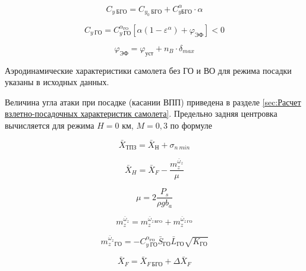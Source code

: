 \begin{equation}
    \label{eq:CyБГО}
    C_{y \ \text{БГО}} = C_{y_0 \ \text{БГО}} + C_{y \text{БГО}}^\alpha \cdot \alpha
\end{equation}  

\begin{equation}
    \label{eq:CyГО}
    C_{y \ \text{ГО}} = C_{y \ \text{ГО}}^{\alpha_\text{ГО}}[\alpha(1 - \varepsilon^\alpha) + \varphi_\text{ЭФ}] < 0
\end{equation}

\begin{equation}
    \label{eq:fiЭФ}
    \varphi_\text{ЭФ} = \varphi_\text{уст} + n_B \cdot \delta_{max}
\end{equation}

Аэродинамические характеристики самолета без ГО и ВО для режима посадки указаны в исходных данных.

Величина угла атаки при посадке (касании ВПП) приведена в разделе \ref{sec:Расчет взлетно-посадочных характеристик самолета}. Предельно задняя центровка вычисляется для режима $H=0$ км, $M=0,3$ по формуле

\begin{equation}
    \label{eq:Предельно задняя центровка}
    \bar{X}_\text{ТПЗ} = \bar{X}_\text{Н} + \sigma_{n \ min}
\end{equation}

\begin{equation}
    \label{eq:Нейтральная центровка}
    \bar{X}_H = \bar{X}_F - \frac{m_z^{\bar{\omega}_z}}{\mu}
\end{equation}

\begin{equation}
    \label{eq:Относительная плотность самолёта}
    \mu = 2\frac{P_s}{\rho g b_a}
\end{equation}

\begin{equation}
    \label{eq:Относительный коэффициент демпфирующего момента}
    m_z^{\bar{\omega}_z} = m_z^{\bar{\omega}_{z \ \text{БГО}}} + m_z^{\bar{\omega}_{z \ \text{ГО}}}
\end{equation}

\begin{equation}
    \label{eq:bar(wz)ГО}
    m_z^{\bar{\omega}_z}_{\text{ГО}} = -C_{y \ \text{ГО}}^{\alpha_\text{ГО}} \bar{S}_\text{ГО} \bar{L}_\text{ГО} \sqrt{K_\text{ГО}}
\end{equation}

\begin{equation}
    \label{eq:Относительная координата фокуса}
    \bar{X}_F = \bar{X}_{F \ \text{БГО}} + \Delta \bar{X}_F
\end{equation}

